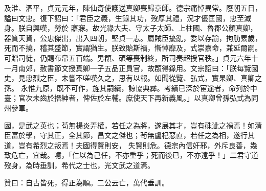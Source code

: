 \begin{pinyinscope}
 及淮、泗平，貞元元年，陳仙奇使護送真卿喪歸京師。德宗痛悼異常。廢朝五日，謚曰文忠。復下詔曰：「君臣之義，生錄其功，歿厚其禮，況才優匡國，忠至滅身。朕自興嘆，勞於
 寤寐。故光祿大夫、守太子太師、上柱國、魯郡公顏真卿，器質天資，公忠傑出，出入四朝，堅貞一志。屬賊臣擾亂，委以存諭，拘肋累歲，死而不撓，稽其盛節，實謂猶生。朕致貽斯禍，慚悼靡及，式崇嘉命，兼延爾嗣。可贈司徒，仍賜布帛五百端。男頵、碩等喪制終，所司奏超授官秩。」貞元六年十一月南郊，赦書節文授真卿一子五品正員官，故頵得錄用。文宗詔曰：「朕每覽國史，見忠烈之臣，未嘗不嗟嘆久之，思有以報。如聞從覽、弘式，實杲卿、真卿之孫。
 永惟九原，既不可作，旌其嗣續，諒協典彞。考績已深於宦途者，命列於中臺；官次未齒於搢紳者，俾佐於左輔。庶使天下再新義風。」以真卿曾孫弘式為同州參軍。



 國，是武之英也；茍無楊炎弄權，若任之為將，遂展其才，豈有硃泚之禍焉！如清臣富於學，守其正，全其節，昌文之傑也；茍無盧杞惡直，若任之為相，遂行其道，豈有希烈之叛焉！夫國得賢則安，
 失賢則危。德宗內信奸邪，外斥良善，幾致危亡，宜哉。噫，「仁以為己任，不亦重乎；死而後已，不亦遠乎！」二君守道歿身，為時垂訓，希代之士也，光文武之道焉。



 贊曰：自古皆死，得正為順。二公云亡，萬代垂訓。



\end{pinyinscope}